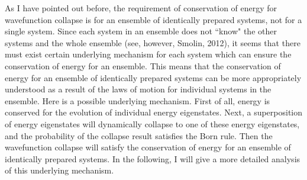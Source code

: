 As I have pointed out before, the requirement of conservation of energy for wavefunction collapse is for an ensemble of identically prepared systems, not for a single system. 
Since each system in an ensemble does not ``know" the other systems and the whole ensemble (see, however, Smolin, 2012), it seems that there must exist certain underlying mechanism for each system which can ensure the conservation of energy for an ensemble. This means that the conservation of energy for an ensemble of identically prepared systems can be more appropriately understood as a result of the laws of motion for individual systems in the ensemble. 
Here is a possible underlying mechanism. First of all, energy is conserved for the evolution of individual energy eigenstates. 
Next, a superposition of energy eigenstates will dynamically collapse to one of these energy eigenstates, and the probability of the collapse result satisfies the Born rule. Then the wavefunction collapse will satisfy the conservation of energy for an ensemble of identically prepared systems. In the following, I will give a more detailed analysis of this underlying mechanism.


